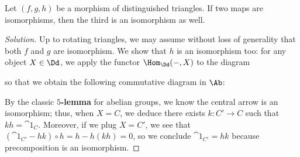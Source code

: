 \begin{exercise!}\label{5lemma}
    Let $(f,g,h)$ be a morphism of distinguished triangles. 
    If two maps are isomorphisms, then the third is an isomorphism as well.
    \begin{proof}[Solution]
        Up to rotating triangles, we may assume
        without loss of generality that both $f$ and $g$ are isomorphism.
        We show that $h$ is an isomorphism too:
        for any object $X \in \Dd$, we apply the functor 
        $\Hom_{\Dd}(-,X)$ to the diagram
        \begin{center}
        \end{center}
        so that we obtain the following commutative diagram in $\Ab$:
        \begin{center}
        \end{center}
        By the classic \textbf{$5$-lemma} for abelian groups,
        we know the central arrow is an isomorphism;
        thus, when $X = C$, we deduce there exists $k:C' \to C$
        such that $kh = \cat{1}_{C}$. Moreover, if we plug $X=C'$,
        we see that $(\cat{1}_{C'} - hk) \circ h = h - h(kh) = 0$,
        so we conclude $\cat{1}_{C'} = hk$ because precomposition
        is an isomorphism.
    \end{proof}
\end{exercise!}

